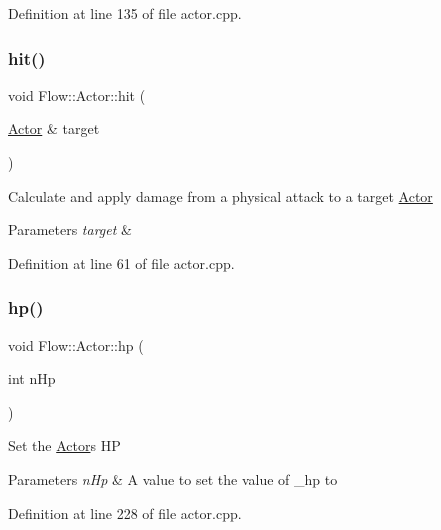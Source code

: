 Definition at line 135 of file actor.\+cpp.

\hypertarget{class_flow_1_1_actor_a8d41b4076822bd8bc03f44119c7546b0}{}\label{class_flow_1_1_actor_a8d41b4076822bd8bc03f44119c7546b0} 
\subsubsection{\texorpdfstring{hit()}{hit()}}
{\footnotesize\ttfamily void Flow\+::\+Actor\+::hit (\begin{DoxyParamCaption}\item[{\hyperlink{class_flow_1_1_actor}{Actor} \&}]{target }\end{DoxyParamCaption})}

Calculate and apply damage from a physical attack to a target \hyperlink{class_flow_1_1_actor}{Actor} 
\begin{DoxyParams}{Parameters}
{\em target} & \\
\hline
\end{DoxyParams}


Definition at line 61 of file actor.\+cpp.

\hypertarget{class_flow_1_1_actor_ab6e6c8f8feb5112cff282769e00f8cc5}{}\label{class_flow_1_1_actor_ab6e6c8f8feb5112cff282769e00f8cc5} 
\subsubsection{\texorpdfstring{hp()}{hp()}\hspace{0.1cm}{\footnotesize\ttfamily [1/3]}}
{\footnotesize\ttfamily void Flow\+::\+Actor\+::hp (\begin{DoxyParamCaption}\item[{int}]{n\+Hp }\end{DoxyParamCaption})}

Set the \hyperlink{class_flow_1_1_actor}{Actor}\textquotesingle{}s HP 
\begin{DoxyParams}{Parameters}
{\em n\+Hp} & A value to set the value of \+\_\+hp to \\
\hline
\end{DoxyParams}


Definition at line 228 of file actor.\+cpp.

\hypertarget{class_flow_1_1_actor_a26d5b782a05e0b8fc8a5d9b3565b97d8}{}\label{class_flow_1_1_actor_a26d5b782a05e0b8fc8a5d9b3565b97d8} 
